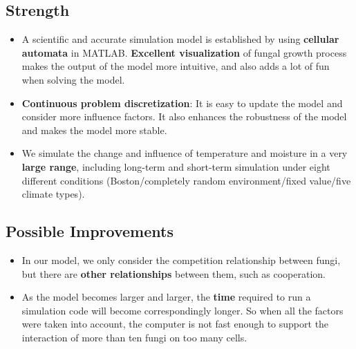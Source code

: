 \documentclass[a4paper,12pt]{article}
\begin{document}
\subsection{Strength}
\begin{itemize}
\setlength{\itemsep}{0ex} %
	\item A scientific and accurate simulation model is established by using \textbf{cellular automata} in MATLAB. \textbf{Excellent visualization} of fungal growth process makes the output of the model more intuitive, and also adds a lot of fun when solving the model.
	\item \textbf{Continuous problem discretization}: It is easy to update the model and consider more influence factors. It also enhances the robustness of the model and makes the model more stable.
	\item We simulate the change and influence of temperature and moisture in a very \textbf{large range}, including long-term and short-term simulation under eight different conditions (Boston/completely random environment/fixed value/five climate types).
\end{itemize} 
\subsection{Possible Improvements}
\begin{itemize}
\setlength{\itemsep}{0ex} %
	\item In our model, we only consider the competition relationship between fungi, but there are \textbf{other relationships} between them, such as cooperation.
	\item As the model becomes larger and larger, the \textbf{time} required to run a simulation code will become correspondingly longer. So when all the factors were taken into account, the computer is not fast enough to support the interaction of more than ten fungi on too many cells.
\end{itemize}
\end{document}
